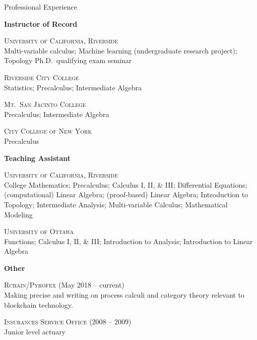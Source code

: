 \documentclass{Resume} %
\begin{document}

\begin{rSection}{Professional Experience}

\textbf{Instructor of Record}
  
  \textsc{University of California, Riverside} 
  \\
  Multi-variable calculus; Machine learning (undergraduate
  research project); Topology Ph.D.~qualifying exam seminar
  
  \textsc{Riverside City College} \\
  Statistics; Precalculus; Intermediate Algebra

  \textsc{Mt.~San Jacinto College} \\
  Precalculus; Intermediate Algebra

  \textsc{City College of New York} \\
  Precalculus

\textbf{Teaching Assistant} 

  \textsc{University of California, Riverside} \\
  College Mathematics; Precalculus; Calculus I, II, \& III;
  Differential Equations; (computational) Linear Algebra;
  (proof-based) Linear Algebra; Introduction to Topology;
  Intermediate Analysis; Multi-variable Calculus; Mathematical Modeling

  \textsc{University of Ottawa}  \\
  Functions; Calculus I, II, \& III; Introduction to Analysis; Introduction to Linear Algebra

\textbf{Other}

  \textsc{Rchain/Pyrofex} (May 2018 -- current) \\
  Making precise and writing on process calculi and category theory
  relevant to blockchain technology.

  \textsc{Insurances Service Office} (2008 -- 2009) \\
  Junior level actuary

\end{rSection}

\end{document}
